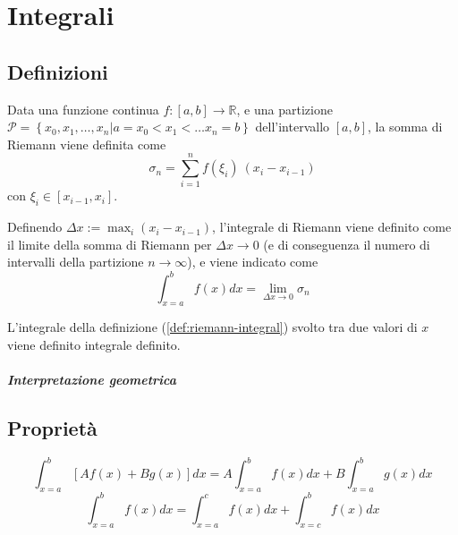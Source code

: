\chapter{Integrali}

\section{Definizioni}
\begin{definition} Data una funzione continua $f:[a,b] \rightarrow \mathbb{R}$, e una partizione $\mathcal{P} = \left\{x_0, x_1, \dots, x_n | a = x_0 < x_1 < \dots x_n = b \right\}$ dell'intervallo $[a,b]$, la somma di Riemann viene definita come
    \begin{equation}
        \sigma_n = \sum_{i=1}^{n} f(\xi_i) \ (x_{i} - x_{i-1})
    \end{equation}
con $\xi_i \in [x_{i-1}, x_i]$.
\end{definition}

\begin{definition}\label{def:riemann-integral} Definendo $\Delta x := \max_i(x_i - x_{i-1}) $, l'integrale di Riemann viene definito come il limite della somma di Riemann per $\Delta x  \rightarrow 0$ (e di conseguenza il numero di intervalli della partizione $n \rightarrow \infty$), e viene indicato come
    \begin{equation}
        \int_{x=a}^b f(x) dx = \lim_{\Delta x \rightarrow 0} \sigma_n
    \end{equation}
\end{definition}

\begin{definition} L'integrale della definizione (\ref{def:riemann-integral}) svolto tra due valori di $x$ viene definito integrale definito. 
\end{definition}

\paragraph{Interpretazione geometrica}

\begin{definition}
\end{definition}

\section{Proprietà}
\begin{equation}
    \int_{x=a}^{b} \left[ A f(x) + B g(x) \right] dx = A \int_{x=a}^{b} f(x) dx + B \int_{x=a}^{b} g(x) dx
\end{equation}
\begin{equation}
    \int_{x=a}^{b} f(x) dx = \int_{x=a}^{c} f(x) dx + \int_{x=c}^{b} f(x) dx
\end{equation}

